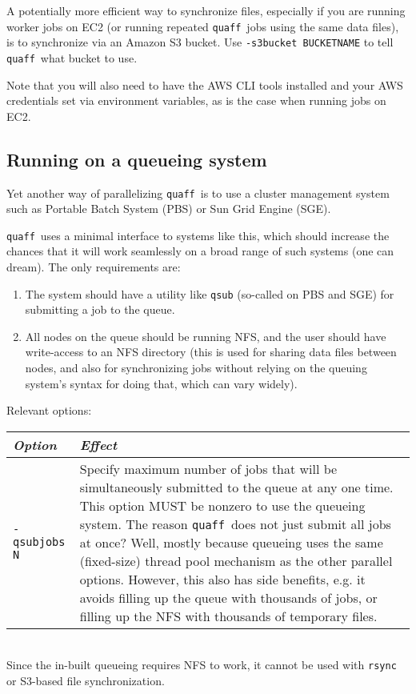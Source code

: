 \documentclass{article}
\newcommand\quaff{{\tt quaff}}
\newcommand\opt[1]{{\tt -#1}}
\newcommand\opttable[1]{\begin{tabular}[l]{ll} \hline {\em Option} & {\em Effect} \\ #1 \hline \end{tabular} \\}
\newcommand\optdesc[2]{\hline \opt{#1} & \parbox{.8\linewidth}{#2} \\ }
\begin{document}
A potentially more efficient way to synchronize files, especially if you are running worker jobs on EC2
(or running repeated \quaff\ jobs using the same data files),
is to synchronize via an Amazon S3 bucket.
Use \opt{s3bucket BUCKETNAME} to tell \quaff\ what bucket to use.

Note that you will also need to have the AWS CLI tools installed and your AWS credentials set via environment variables,
as is the case when running jobs on EC2.

\subsection{Running on a queueing system}

Yet another way of parallelizing \quaff\ is to use a cluster management system
such as Portable Batch System (PBS) or Sun Grid Engine (SGE).

\quaff\ uses a minimal interface to systems like this, which should increase the chances
that it will work seamlessly on a broad range of such systems (one can dream).
The only requirements are:
\begin{enumerate}
\item The system should have a utility like {\tt qsub} (so-called on PBS and SGE)
  for submitting a job to the queue.
\item All nodes on the queue should be running NFS, and the user should have write-access
  to an NFS directory (this is used for sharing data files between nodes, and also for synchronizing jobs
  without relying on the queuing system's syntax for doing that, which can vary widely).
  \end{enumerate}

Relevant options:

\opttable{
  \optdesc{qsubjobs N}{Specify maximum number of jobs that will be simultaneously submitted
    to the queue at any one time. This option MUST be nonzero to use the queueing system.
    The reason \quaff\ does not just submit all jobs at once? Well, mostly because queueing uses
    the same (fixed-size) thread pool mechanism as the other parallel options. However, this
    also has side benefits, e.g. it avoids filling up the queue with thousands of jobs, or
    filling up the NFS with thousands of temporary files.
  }
  \optdesc{qsub PATH}{Specify the path to the executable that is used to submit jobs (default is {\tt qsub}).
    One way to test that queueing is set up correctly is to set this option to {\tt /bin/sh}, which will just execute the job synchronously.}
  \optdesc{qsubopts OPTS}{Specify options to the {\tt qsub} program. This is typically where you would specify what queue you want to use.}
  \optdesc{qsubheader FILE}{Specify a header file for the temporary shell script file that is created and passed to {\tt qsub}. By default the header is just the shebang line, {\tt \#!/bin/sh}. However, some queueing systems may require extra information here, e.g. environment variables, or (as with PBS) additional configuration directives that are specified as comments in the script file.}
}

Since the in-built queueing requires NFS to work, it cannot be used with {\tt rsync} or S3-based file synchronization.
\end{document}
